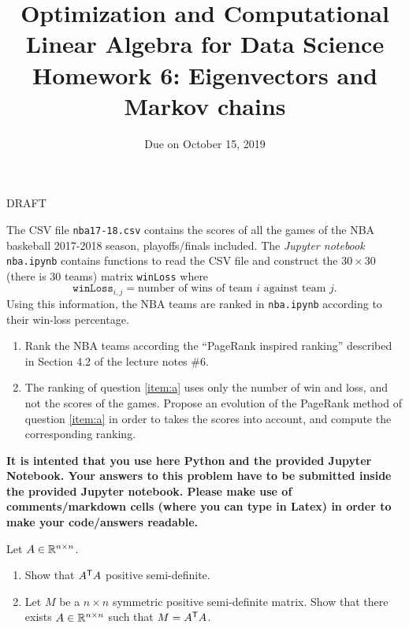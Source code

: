 \documentclass[11pt,nocut]{article}
\title{\vspace{-2.0cm}%
	Optimization and Computational Linear Algebra for Data Science\\
Homework 6: Eigenvectors and Markov chains}
\date{\vspace{-1cm}Due on October 15, 2019}
\begin{document}
\maketitle


DRAFT

\color{green}

\begin{problem}[4 points]
	The CSV file \texttt{nba17-18.csv} contains the scores of all the games of the NBA baskeball 2017-2018 season, playoffs/finals included. 
	The \emph{Jupyter notebook} \texttt{nba.ipynb} contains functions to read the CSV file and construct the $30 \times 30$ (there is $30$ teams) matrix \texttt{winLoss} where
	$$
	\texttt{winLoss}_{i,j} = \text{number of wins of team $i$ against team $j$.}
	$$
	Using this information, the NBA teams are ranked in \texttt{nba.ipynb} according to their win-loss percentage.
	\begin{enumerate}[label=\normalfont(\textbf{\alph*})]
		\item \label{item:a} Rank the NBA teams according the ``PageRank inspired ranking'' described in Section 4.2 of the lecture notes \#6.
		\item The ranking of question \ref{item:a} uses only the number of win and loss, and not the scores of the games. Propose an evolution of the PageRank method of question \ref{item:a} in order to takes the scores into account, and compute the corresponding ranking.
	\end{enumerate}

	\textbf{It is intented that you use here Python and the provided Jupyter Notebook. Your answers to this problem have to be submitted inside the provided Jupyter notebook. Please make use of comments/markdown cells (where you can type in Latex) in order to make your code/answers readable.}
\end{problem}


\vspace{1mm}


\begin{problem}[2 points]
	Let $A \in \mathbb{R}^{n \times n}$.
	\begin{enumerate}[label=\normalfont(\textbf{\alph*})]
		\item Show that $A^{{\sf T}} A$ positive semi-definite.
		\item Let $M$ be a $n \times n$ symmetric positive semi-definite matrix. Show that there exists $A \in \mathbb{R}^{n \times n}$ such that $M = A^{{\sf T}} A$.
	\end{enumerate}
\end{problem}

\vspace{1mm}

\begin{problem}[3 points]
\end{problem}

\vspace{1mm}


\begin{problem}[$\star$]
\end{problem}
\vspace{1cm}
\centerline{}

%
%
\end{document}
